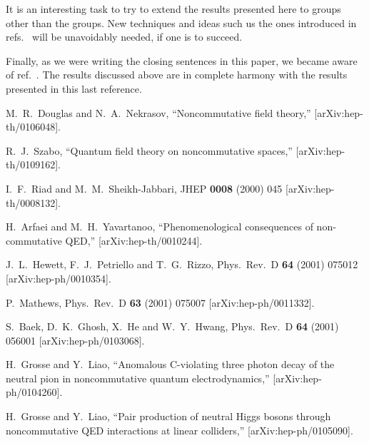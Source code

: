 \documentclass[a4paper,12pt]{article}
\begin{document}
It is an interesting task to try to extend the results presented here to 
groups  other than the \coordHE{} groups. New techniques and ideas such us the 
ones introduced in refs.~\cite{Bonora:2000td, Jurco:2001rq} will be 
unavoidably needed, if one is to succeed. 

Finally, as we were writing the closing sentences in this paper, we 
became aware of ref.~\cite{Bonora:2001fa}. The results discussed above are
in complete harmony with the results presented in this last reference.

\begin{thebibliography}{99}


M.~R.~Douglas and N.~A.~Nekrasov,
``Noncommutative field theory,''
[arXiv:hep-th/0106048].

R.~J.~Szabo,
``Quantum field theory on noncommutative spaces,''
[arXiv:hep-th/0109162].


I.~F.~Riad and M.~M.~Sheikh-Jabbari,
JHEP {\bf 0008} (2000) 045
[arXiv:hep-th/0008132].


H.~Arfaei and M.~H.~Yavartanoo,
``Phenomenological consequences of non-commutative QED,''
[arXiv:hep-th/0010244].

J.~L.~Hewett, F.~J.~Petriello and T.~G.~Rizzo,
Phys.\ Rev.\ D {\bf 64} (2001) 075012
[arXiv:hep-ph/0010354].

P.~Mathews,
Phys.\ Rev.\ D {\bf 63} (2001) 075007
[arXiv:hep-ph/0011332].



S.~Baek, D.~K.~Ghosh, X.~He and W.~Y.~Hwang,
Phys.\ Rev.\ D {\bf 64} (2001) 056001
[arXiv:hep-ph/0103068].

H.~Grosse and Y.~Liao,
``Anomalous C-violating three photon decay of the neutral pion in  noncommutative quantum electrodynamics,''
[arXiv:hep-ph/0104260].


H.~Grosse and Y.~Liao,
``Pair production of neutral Higgs bosons through noncommutative QED  interactions at linear colliders,''
[arXiv:hep-ph/0105090].




\end{thebibliography}
\end{document}

